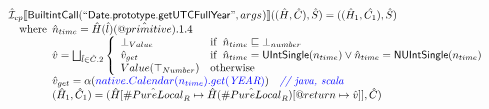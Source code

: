 \documentclass{article}
\makeatletter
\newcommand{\SF}[1]{\mbox{\textsf{#1}}}
\newcommand{\comment}[1]{\textit{#1}}
\newcommand{\wherec}[1]{{\rm where}\begin{array}[t]{l}#1\end{array}}
\newcommand{\ifc}[1]{{\rm if}\begin{array}[t]{l}#1\end{array}}
\newcommand{\owc}{{\rm otherwise}}
\newcommand{\aI}{\hat{\mathcal{I}}}
\newcommand{\lbr}{\llbracket}
\newcommand{\rbr}{\rrbracket}
\newcommand{\varprop}[1]{@#1}
\newcommand{\avarloc}[1]{\hat{\##1}}
\newcommand{\avarprop}[1]{\hat{@#1}}
\def\inblue{\color{blue}}
\def\inblue{\color{blue}}
\makeatother
\begin{document}
\[\begin{array}{l}
\aI _{cp}\lbr \SF{BuiltintCall}(``\SF{Date.prototype.getUTCFullYear}",args_{})\rbr((\hat{H},\hat{C}), \hat{S})
  = ((\hat{H}_1, \hat{C_1}), \hat{S})\\
\quad\wherec{
  \hat{n}_{time} = \hat{H}(\hat{l})(\avarprop{primitive}).1.4\\
  \hat{v} = \bigsqcup_{\hat{l} \in \hat{C}.2} \left\{\begin{array}{ll}
      \bot_{Value} & \ifc{\hat{n}_{time} \sqsubseteq  \bot_{number}}\\
      \hat{v}_{get} &
      \ifc{\hat{n}_{time} = \SF{UIntSingle}(n_{time}) \lor\hat{n}_{time} = \SF{NUIntSingle}(n_{time}) }\\
      Value(\top_{Number}) & \owc
    \end{array}\right.\\
  \hat{v}_{get} = \alpha({\inblue native.Calendar(n_{time}).get(\emph{YEAR})})
    \quad\comment{{\inblue // java, scala}}\\  
  (\hat{H}_1, \hat{C}_1) = 
    (\hat{H}[\avarloc{PureLocal}_R \mapsto \hat{H}(\avarloc{PureLocal}_R)
      [\varprop{return} \mapsto \hat{v}]], \hat{C})\\
  }\\
\\\\
\end{array}
\]
\end{document}

